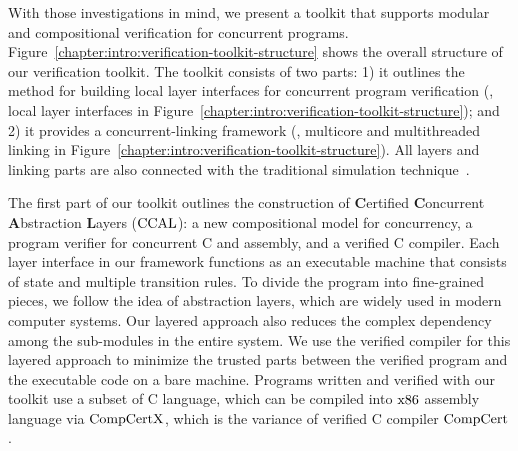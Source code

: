 With those investigations in mind, 
we present a toolkit that supports modular and compositional verification for concurrent programs.
Figure~\ref{chapter:intro:verification-toolkit-structure}  shows the overall structure of our verification toolkit. 
The toolkit consists of two parts: 
1) it outlines the method for building local layer interfaces for concurrent program verification (\ie, local layer interfaces in Figure~\ref{chapter:intro:verification-toolkit-structure}); 
and 2) it provides a concurrent-linking framework (\ie, multicore and multithreaded linking in Figure~\ref{chapter:intro:verification-toolkit-structure}). 
All layers and linking parts are also connected with the traditional simulation technique~\cite{compcert, deepspec}. 

 
The first part of our toolkit outlines the construction of \textbf{C}ertified \textbf{C}oncurrent \textbf{A}bstraction \textbf{L}ayers ($\mathrm{CCAL}$): a new compositional model for concurrency, 
a program verifier for concurrent C and assembly, and a verified C compiler. 
Each layer interface in our framework functions as an executable machine that consists of state and multiple transition rules. 
To divide the program into fine-grained pieces, we follow the idea of abstraction layers, which are widely used in modern computer systems. 
Our layered approach also reduces the complex dependency among the sub-modules in the entire system. 
We use the verified compiler for this layered approach to minimize the trusted parts between the verified program and the executable code on a bare machine. 
Programs written and verified with our toolkit use a subset of C language, which can be compiled into $\mathrm{x86}$ assembly language via $\mathrm{CompCertX}$, which is the variance of verified C compiler $\mathrm{CompCert}$.  

